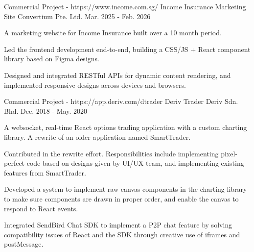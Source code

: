 

\begin{cventries}

  \cventry
    {Commercial Project - https://www.income.com.sg/} %
    {Income Insurance Marketing Site} %
    {Convertium Pte. Ltd.} %
    {Mar. 2025 - Feb. 2026} %
    {
      \begin{cvitems} %
        \item {A marketing website for Income Insurance built over a 10 month period.}
        \item {Led the frontend development end-to-end, building a CSS/JS + React component library based on Figma designs.}
        \item {Designed and integrated RESTful APIs for dynamic content rendering, and implemented responsive designs across devices and browsers.}
      \end{cvitems}
    }

  \cventry
    {Commercial Project - https://app.deriv.com/dtrader} %
    {Deriv Trader} %
    {Deriv Sdn. Bhd.} %
    {Dec. 2018 - May. 2020} %
    {
      \begin{cvitems} %
        \item {A websocket, real-time React options trading application with a custom charting library. A rewrite of an older application named SmartTrader.}
        \item {Contributed in the rewrite effort. Responsibilities include implementing pixel-perfect code based on designs given by UI/UX team, and implementing existing features from SmartTrader.}
        \item {Developed a system to implement raw canvas components in the charting library to make sure components are drawn in proper order, and enable the canvas to respond to React events.}
        \item {Integrated SendBird Chat SDK to implement a P2P chat feature by solving compatibility issues of React and the SDK through creative use of iframes and postMessage. }
      \end{cvitems}
    }


\end{cventries}
